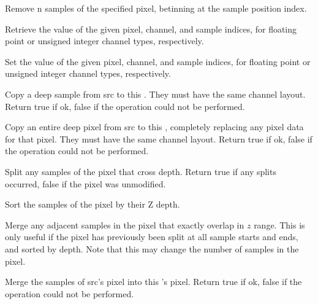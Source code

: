 Remove {\cf n} samples of the specified pixel, betinning at the sample
position index.
\apiend

Retrieve the value of the given pixel, channel, and sample indices, for
floating point or unsigned integer channel types, respectively.
\apiend

Set the value of the given pixel, channel, and sample indices, for
floating point or unsigned integer channel types, respectively.
\apiend

Copy a deep sample from {\cf src} to this \DeepData. They must have the same
channel layout. Return {\cf true} if ok, {\cf false} if the operation could
not be performed.
\apiend

Copy an entire deep pixel from {\cf src} to this \DeepData, completely
replacing any pixel data for that pixel. They must have the same channel
layout. Return {\cf true} if ok, {\cf false} if the operation could not be
performed.
\apiend

Split any samples of the pixel that cross {\cf depth}. Return {\cf true} if
any splits occurred, {\cf false} if the pixel was unmodified.
\apiend

Sort the samples of the pixel by their Z depth.
\apiend

Merge any adjacent samples in the pixel that exactly overlap in $z$
range. This is only useful if the pixel has previously been split at
all sample starts and ends, and sorted by depth. Note that this may change
the number of samples in the pixel.
\apiend

Merge the samples of {\cf src}'s pixel into this \DeepData's pixel.
Return {\cf true} if ok, {\cf false} if the operation could not be
performed.
\apiend


